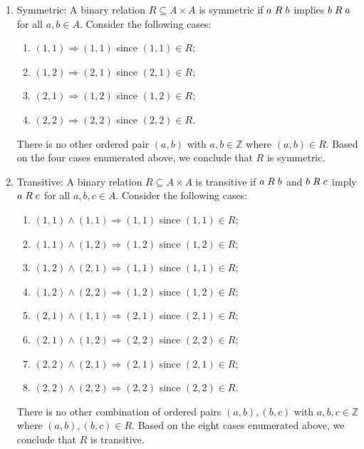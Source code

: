\documentclass[a4paper,12pt]{article}
\begin{document}
\begin{enumerate}[label=(\alph*)]
\begin{enumerate}
\item Symmetric: A binary relation $R \subseteq A \times A$ is symmetric if $a \hspace{1mm} R \hspace{1mm} b$ implies $b \hspace{1mm} R \hspace{1mm} a$ for all $a, b \in A$. Consider the following cases:

\begin{enumerate}
\item $(1,1) \Rightarrow (1,1)$ since $(1,1) \in R$;
\item $(1,2) \Rightarrow (2,1)$ since $(2,1) \in R$;
\item $(2,1) \Rightarrow (1,2)$ since $(1,2) \in R$;
\item $(2,2) \Rightarrow (2,2)$ since $(2,2) \in R$.
\end{enumerate}

There is no other ordered pair $(a,b)$ with $a,b \in \mathbb{Z}$ where $(a,b) \in R$. Based on the four cases enumerated above, we conclude that $R$ is symmetric.

\item Transitive: A binary relation $R \subseteq A \times A$ is transitive if $a \hspace{1mm} R \hspace{1mm} b$ and $b \hspace{1mm} R \hspace{1mm} c$ imply $a \hspace{1mm} R \hspace{1mm} c$ for all $a, b, c \in A$. Consider the following cases:

\begin{enumerate}
\item $(1,1) \land (1,1) \Rightarrow (1,1)$ since $(1,1) \in R$;
\item $(1,1) \land (1,2) \Rightarrow (1,2)$ since $(1,2) \in R$;
\item $(1,2) \land (2,1) \Rightarrow (1,1)$ since $(1,1) \in R$;
\item $(1,2) \land (2,2) \Rightarrow (1,2)$ since $(1,2) \in R$;
\item $(2,1) \land (1,1) \Rightarrow (2,1)$ since $(2,1) \in R$;
\item $(2,1) \land (1,2) \Rightarrow (2,2)$ since $(2,2) \in R$;
\item $(2,2) \land (2,1) \Rightarrow (2,1)$ since $(2,1) \in R$;
\item $(2,2) \land (2,2) \Rightarrow (2,2)$ since $(2,2) \in R$.
\end{enumerate}

There is no other combination of ordered pairs $(a,b), (b,c)$ with $a,b,c \in \mathbb{Z}$ where $(a,b), (b,c) \in R$. Based on the eight cases enumerated above, we conclude that $R$ is transitive. 
\end{enumerate}
\end{enumerate}
\end{document}
